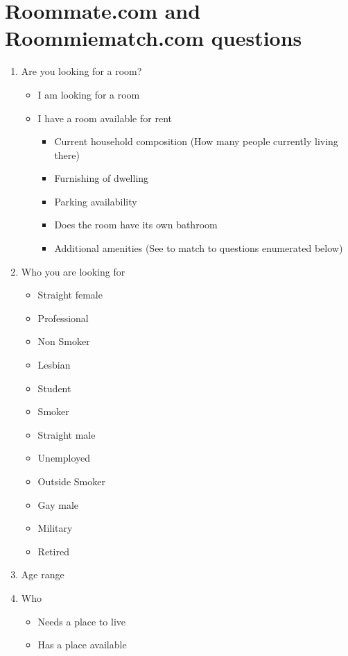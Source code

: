 \documentclass[journal]{./IEEE/IEEEtran}
\begin{document}
\newpage
\appendices
\section{Roommate.com and Roommiematch.com questions} %
\begin{enumerate}
    \item Are you looking for a room?
    \begin{itemize}
        \item I am looking for a room
        \item I have a room available for rent
        \begin{itemize}
            \item Current household composition (How many people currently living there)
            \item Furnishing of dwelling
            \item Parking availability
            \item Does the room have its own bathroom
            \item Additional amenities (See to match to questions enumerated below)
        \end{itemize}
    \end{itemize}
    \item Who you are looking for
    \begin{itemize}
        \item Straight female
        \item Professional
        \item Non Smoker
        \item Lesbian
        \item Student
        \item Smoker
        \item Straight male
        \item Unemployed
        \item Outside Smoker
        \item Gay male
        \item Military
        \item Retired
    \end{itemize}
    \item Age range
    \item Who
    \begin{itemize}
        \item Needs a place to live
        \item Has a place available

\end{itemize}
\end{enumerate}
\end{document}
